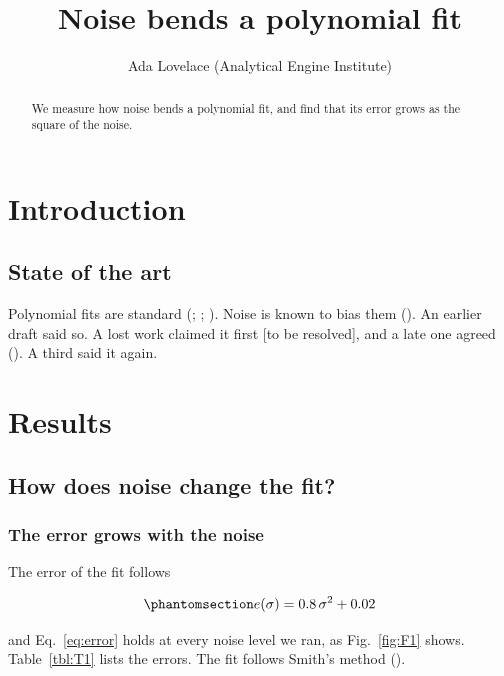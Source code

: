 \documentclass[
]{article}
\title{Noise bends a polynomial fit}
\author{Ada Lovelace (Analytical Engine Institute)}
\date{}
\begin{document}
\maketitle
\begin{abstract}
We measure how noise bends a polynomial fit, and find that its error
grows as the square of the noise.
\end{abstract}

\section{Introduction}\label{introduction}

\subsection{State of the art}\label{introduction-state-of-the-art}

Polynomial fits are standard (; ;
). Noise is known to bias them
(). An earlier draft
said so. A lost work claimed it first {[}to be resolved{]}, and a late
one agreed (). A third said it again.

\section{Results}\label{results}

\subsection{How does noise change the fit?}\label{O1}

\subsubsection{The error grows with the noise}\label{R1}

The error of the fit follows

\begin{equation}\protect\phantomsection\label{eq:error}{ e(\sigma) = 0.8\,\sigma^2 + 0.02 }\end{equation}

and Eq.~\ref{eq:error} holds at every noise level we ran, as
Fig.~\ref{fig:F1} shows. Table~\ref{tbl:T1} lists the errors. The fit
follows Smith's method ().
\end{document}
